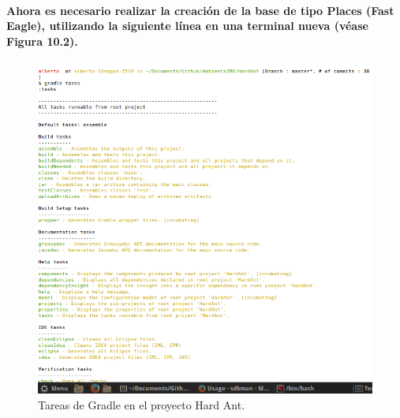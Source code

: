   \paragraph{Ahora es necesario realizar la creación de la base de tipo Places (Fast Eagle), utilizando la siguiente línea en una terminal nueva (véase Figura 10.2).}
  \begin{figure}[h!]
	\centering
		\includegraphics[width=\textwidth]{./images/TerminalGradle}
		\caption{Tareas de Gradle en el proyecto Hard Ant.}
  \end{figure}  
